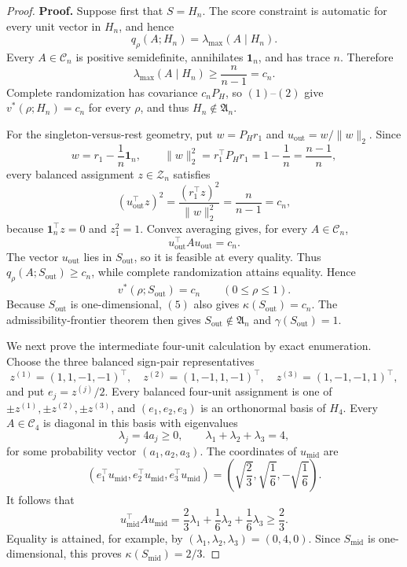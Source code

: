 \documentclass{article}
\begin{document}
\begin{proof}
\textbf{Proof.}
Suppose first that \(S=H_n\).  The score constraint is automatic for every unit vector in \(H_n\), and hence
\[
q_\rho(A;H_n)=\lambda_{\max}(A\mid H_n).
\tag{1}
\]
Every \(A\in\mathcal C_n\) is positive semidefinite, annihilates \(\mathbf1_n\), and has trace \(n\).  Therefore
\[
\lambda_{\max}(A\mid H_n)\geq\frac{n}{n-1}=c_n.
\tag{2}
\]
Complete randomization has covariance \(c_nP_H\), so \((1)\)--\((2)\) give \(v^*(\rho;H_n)=c_n\) for every \(\rho\), and thus \(H_n\notin\mathfrak A_n\).

For the singleton-versus-rest geometry, put \(w=P_Hr_1\) and \(u_{\mathrm{out}}=w/\|w\|_2\).  Since
\[
w=r_1-\frac1n\mathbf1_n,
\qquad
\|w\|_2^2=r_1^\top P_Hr_1=1-\frac1n=\frac{n-1}{n},
\tag{3}
\]
every balanced assignment \(z\in\mathcal Z_n\) satisfies
\[
(u_{\mathrm{out}}^\top z)^2
=\frac{(r_1^\top z)^2}{\|w\|_2^2}
=\frac{n}{n-1}=c_n,
\tag{4}
\]
because \(\mathbf1_n^\top z=0\) and \(z_1^2=1\).  Convex averaging gives, for every \(A\in\mathcal C_n\),
\[
u_{\mathrm{out}}^\top Au_{\mathrm{out}}=c_n.
\tag{5}
\]
The vector \(u_{\mathrm{out}}\) lies in \(S_{\mathrm{out}}\), so it is feasible at every quality.  Thus \(q_\rho(A;S_{\mathrm{out}})\geq c_n\), while complete randomization attains equality.  Hence
\[
v^*(\rho;S_{\mathrm{out}})=c_n
\qquad(0\leq\rho\leq1).
\tag{6}
\]
Because \(S_{\mathrm{out}}\) is one-dimensional, \((5)\) also gives \(\kappa(S_{\mathrm{out}})=c_n\).  The admissibility-frontier theorem then gives \(S_{\mathrm{out}}\notin\mathfrak A_n\) and \(\gamma(S_{\mathrm{out}})=1\).

We next prove the intermediate four-unit calculation by exact enumeration.  Choose the three balanced sign-pair representatives
\[
z^{(1)}=(1,1,-1,-1)^\top,
\quad
z^{(2)}=(1,-1,1,-1)^\top,
\quad
z^{(3)}=(1,-1,-1,1)^\top,
\tag{7}
\]
and put \(e_j=z^{(j)}/2\).  Every balanced four-unit assignment is one of \(\pm z^{(1)},\pm z^{(2)},\pm z^{(3)}\), and \((e_1,e_2,e_3)\) is an orthonormal basis of \(H_4\).  Every \(A\in\mathcal C_4\) is diagonal in this basis with eigenvalues
\[
\lambda_j=4a_j\geq0,
\qquad
\lambda_1+\lambda_2+\lambda_3=4,
\tag{8}
\]
for some probability vector \((a_1,a_2,a_3)\).  The coordinates of \(u_{\mathrm{mid}}\) are
\[
(e_1^\top u_{\mathrm{mid}},e_2^\top u_{\mathrm{mid}},e_3^\top u_{\mathrm{mid}})
=\left(\sqrt{\frac23},\sqrt{\frac16},-\sqrt{\frac16}\right).
\tag{9}
\]
It follows that
\[
u_{\mathrm{mid}}^\top Au_{\mathrm{mid}}
=\frac23\lambda_1+\frac16\lambda_2+\frac16\lambda_3
\geq\frac23.
\tag{10}
\]
Equality is attained, for example, by \((\lambda_1,\lambda_2,\lambda_3)=(0,4,0)\).  Since \(S_{\mathrm{mid}}\) is one-dimensional, this proves \(\kappa(S_{\mathrm{mid}})=2/3\).


\end{proof}
\end{document}
